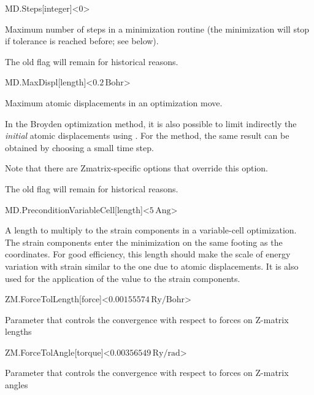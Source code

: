 \begin{fdfentry}{MD.Steps}[integer]<0>
  
  Maximum number of steps in a minimization routine
  (the minimization will stop if tolerance is reached before; see
   below).

  \note The old flag  will remain for historical
  reasons.

\end{fdfentry}

\begin{fdfentry}{MD.MaxDispl}[length]<$0.2\,\mathrm{Bohr}$>
  
  Maximum atomic displacements in an optimization move.

  In the Broyden optimization method, it is also possible to limit
  indirectly the \textit{initial\/} atomic displacements using
  . For the  method, the
  same result can be obtained by choosing a small time step.

  Note that there are Zmatrix-specific options that override this option.

  \note The old flag  will remain for historical
  reasons.

\end{fdfentry}

\begin{fdfentry}{MD.PreconditionVariableCell}[length]<$5\,\mathrm{Ang}$>
  
  A length to multiply to the strain components in a variable-cell
  optimization. The strain components enter the minimization on the
  same footing as the coordinates. For good efficiency, this length
  should make the scale of energy variation with strain similar to the
  one due to atomic displacements. It is also used for the application
  of the  value to the strain components.

\end{fdfentry}


\begin{fdfentry}{ZM.ForceTolLength}[force]<$0.00155574\,\mathrm{Ry/Bohr}$>
  
  Parameter that controls the convergence with respect to forces on
  Z-matrix lengths

\end{fdfentry}


\begin{fdfentry}{ZM.ForceTolAngle}[torque]<$0.00356549\,\mathrm{Ry/rad}$>
  
  Parameter that controls the convergence with respect to forces on
  Z-matrix angles

\end{fdfentry}

